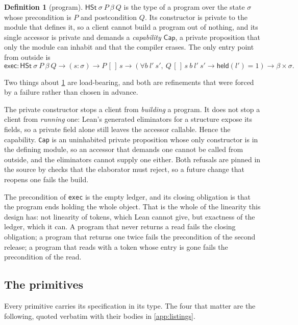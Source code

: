 \documentclass[11pt,a4paper]{article}
\theoremstyle{definition}
\newtheorem{definition}{Definition}[section]
\theoremstyle{plain}
\newcommand{\held}{\mathsf{held}}
\newcommand{\code}[1]{\texttt{#1}}
\begin{document}
\begin{definition}[program]\label{def:hst}
$\mathsf{HSt}\ \sigma\ P\ \beta\ Q$ is the type of a program over the state
$\sigma$ whose precondition is $P$ and postcondition $Q$. Its constructor is
private to the module that defines it, so a client cannot build a program out of
nothing, and its single accessor is private and demands a \emph{capability}
$\mathsf{Cap}$, a private proposition that only the module can inhabit and that
the compiler erases. The only entry point from outside is
\[
\mathsf{exec} : \mathsf{HSt}\ \sigma\ P\ \beta\ Q \to (s : \sigma) \to P\,[\,]\,s
  \to (\forall b\ l'\ s',\ Q\,[\,]\,s\ b\ l'\ s' \to \held(l') = 1) \to \beta \times \sigma .
\]
\end{definition}

Two things about \cref{def:hst} are load-bearing, and both are refinements that
were forced by a failure rather than chosen in advance.

The private constructor stops a client from \emph{building} a program. It does
not stop a client from \emph{running} one: Lean's generated eliminators for a
structure expose its fields, so a private field alone still leaves the accessor
callable. Hence the capability. \code{Cap} is an uninhabited private proposition
whose only constructor is in the defining module, so an accessor that demands
one cannot be called from outside, and the eliminators cannot supply one either.
Both refusals are pinned in the source by checks that the elaborator must reject,
so a future change that reopens one fails the build.

The precondition of \code{exec} is the empty ledger, and its closing obligation
is that the program ends holding the whole object. That is the whole of the
linearity this design has: not linearity of tokens, which Lean cannot give, but
exactness of the ledger, which it can. A program that never returns a read fails
the closing obligation; a program that returns one twice fails the precondition
of the second release; a program that reads with a token whose entry is gone
fails the precondition of the read.

\subsection{The primitives}

Every primitive carries its specification in its type. The four that matter are
the following, quoted verbatim with their bodies in \cref{app:listings}.
\end{document}
